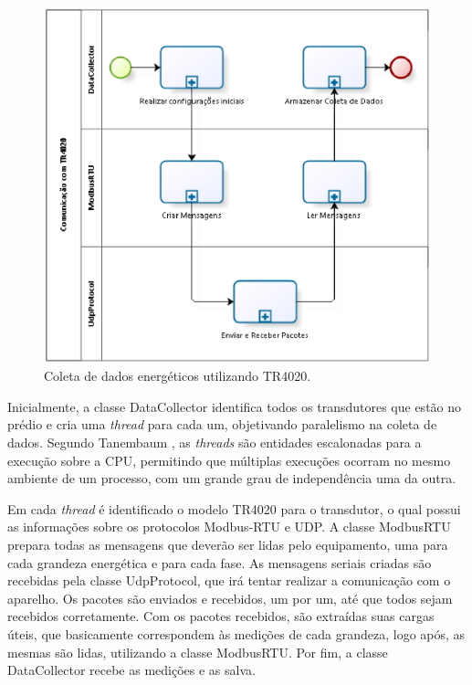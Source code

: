 \begin{figure}[!h]
    \centering
    \includegraphics[keepaspectratio=true,scale=1.0]{figuras/process_1.eps}
    \caption{Coleta de dados energéticos utilizando TR4020.}
    \label{process_1}
\end{figure}

Inicialmente, a classe DataCollector identifica todos os transdutores que estão no prédio e cria uma \textit{thread} para cada um, objetivando paralelismo na coleta de dados. Segundo Tanembaum \cite{tanenbaum_2007}, as \textit{threads} são entidades escalonadas para a execução sobre a CPU, permitindo que múltiplas execuções ocorram no mesmo ambiente de um processo, com um grande grau de independência uma da outra.

Em cada \textit{thread} é identificado o modelo TR4020 para o transdutor, o qual possui as informações sobre os protocolos Modbus-RTU e UDP. A classe ModbusRTU prepara todas as mensagens que deverão ser lidas pelo equipamento, uma para cada grandeza energética e para cada fase. As mensagens seriais criadas são recebidas pela classe UdpProtocol, que irá tentar realizar a comunicação com o aparelho. Os pacotes são enviados e recebidos, um por um, até que todos sejam recebidos corretamente. Com os pacotes recebidos, são extraídas suas cargas úteis, que basicamente correspondem às medições de cada grandeza, logo após, as mesmas são lidas, utilizando a classe ModbusRTU. Por fim, a classe DataCollector recebe as medições e as salva.

